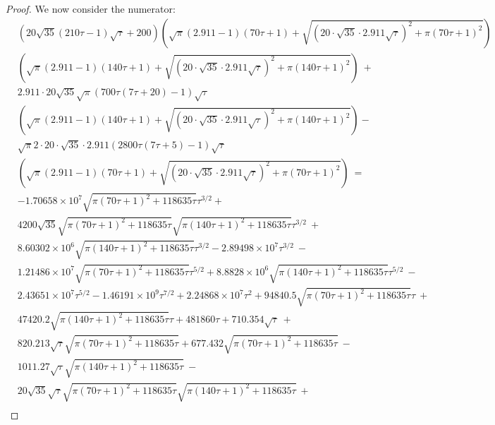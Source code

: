 \documentclass{article}
\begin{document}
\begin{proof}
We now consider the numerator:
\begin{align}
\label{eq:start}
&\left(20 \sqrt{35} (210 \tau-1) \sqrt{\tau}+200\right) \left(\sqrt{\pi } (2.911 -1) (70 \tau+1)+\sqrt{\left(20 \cdot  \sqrt{35} \cdot  2.911 \sqrt{\tau}\right)^2+\pi  (70 \tau+1)^2}\right) \\\nonumber 
&\left(\sqrt{\pi } (2.911 -1) (140 \tau+1)+\sqrt{\left(20 \cdot  \sqrt{35} \cdot  2.911 \sqrt{\tau}\right)^2+\pi  (140 \tau+1)^2}\right) \ +\\ \nonumber
&2.911 \cdot 20 \sqrt{35} \sqrt{\pi } (700 \tau (7  \tau+20)-1) \sqrt{\tau} \\\nonumber & \left(\sqrt{\pi } (2.911 -1) (140 \tau+1)+\sqrt{\left(20 \cdot \sqrt{35}\cdot  2.911 \sqrt{\tau}\right)^2+\pi  (140 \tau+1)^2}\right)-\\ \nonumber 
&\sqrt{\pi } 2 \cdot 20 \cdot  \sqrt{35} \cdot  2.911 (2800 \tau (7  \tau+5)-1) \sqrt{\tau}  \\ \nonumber 
&\left(\sqrt{\pi } (2.911 -1) (70 \tau+1)+\sqrt{\left(20 \cdot  \sqrt{35} \cdot  2.911 \sqrt{\tau}\right)^2+\pi  (70 \tau+1)^2}\right)\ = \\ \nonumber 
&-1.70658\times 10^7 \sqrt{\pi  (70 \tau+1)^2+118635 \tau} \tau^{3/2}+\\ \nonumber 
&4200 \sqrt{35} \sqrt{\pi  (70 \tau+1)^2+118635 \tau} \sqrt{\pi  (140 \tau+1)^2+118635 \tau} \tau^{3/2}\ + \\ \nonumber 
&8.60302\times 10^6 \sqrt{\pi  (140 \tau+1)^2+118635 \tau} \tau^{3/2}-2.89498\times 10^7 \tau^{3/2}\ - \\ \nonumber 
&1.21486\times 10^7 \sqrt{\pi  (70 \tau+1)^2+118635 \tau} \tau^{5/2}+8.8828\times 10^6 \sqrt{\pi  (140 \tau+1)^2+118635 \tau} \tau^{5/2}\ - \\ \nonumber 
&2.43651\times 10^7 \tau^{5/2}-1.46191\times 10^9 \tau^{7/2}+2.24868\times 10^7 \tau^2+94840.5 \sqrt{\pi  (70 \tau+1)^2+118635 \tau} \tau\ + \\ \nonumber 
&47420.2 \sqrt{\pi  (140 \tau+1)^2+118635 \tau} \tau+481860 \tau+710.354 \sqrt{\tau}\ + \\ \nonumber 
&820.213 \sqrt{\tau} \sqrt{\pi  (70 \tau+1)^2+118635 \tau}+677.432 \sqrt{\pi  (70 \tau+1)^2+118635 \tau}\ - \\ \nonumber 
&1011.27 \sqrt{\tau} \sqrt{\pi  (140 \tau+1)^2+118635 \tau}\ - \\ \nonumber 
&20 \sqrt{35} \sqrt{\tau} \sqrt{\pi  (70 \tau+1)^2+118635 \tau} \sqrt{\pi  (140 \tau+1)^2+118635 \tau}\ + \\ \nonumber 

\end{align}
\end{proof}
\end{document}

